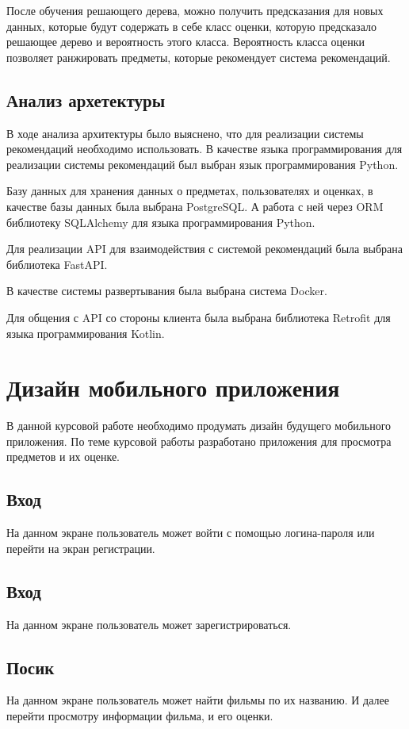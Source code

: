 После обучения решающего дерева, можно получить предсказания для новых данных, которые будут содержать в себе класс
оценки, которую предсказало решающее дерево и вероятность этого класса.
Вероятность класса оценки позволяет ранжировать предметы, которые рекомендует система рекомендаций.

\subsection{Анализ архетектуры}
В ходе анализа архитектуры было выяснено, что для реализации системы рекомендаций необходимо использовать.
В качестве языка программирования для реализации системы рекомендаций был выбран язык программирования Python.

Базу данных для хранения данных о предметах, пользователях и оценках, в качестве базы данных была выбрана PostgreSQL.
А работа с ней через ORM библиотеку SQLAlchemy для языка программирования Python.

Для реализации API для взаимодействия с системой рекомендаций была выбрана библиотека FastAPI.

В качестве системы развертывания была выбрана система Docker.

Для общения с API со стороны клиента была выбрана библиотека Retrofit для языка программирования Kotlin.

\section{Дизайн мобильного приложения}
В данной курсовой работе необходимо продумать дизайн будущего мобильного приложения.
По теме курсовой работы разработано приложения для просмотра предметов и их оценке.

\subsection{Вход}
На данном экране пользователь может войти с помощью логина-пароля или перейти на экран регистрации.


\subsection{Вход}
На данном экране пользователь может зарегистрироваться.


\subsection{Посик}
На данном экране пользователь может найти фильмы по их названию.
И далее перейти просмотру информации фильма, и его оценки.

